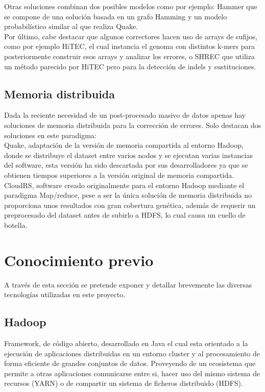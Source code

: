 \documentclass[conference]{IEEEtran}
\begin{document}
Otras soluciones combinan dos posibles modelos como por ejemplo: Hammer que se compone de una solución basada en un grafo Hamming y un modelo probabilístico similar al que realiza Quake.\\

Por último, cabe destacar que algunos correctores hacen uso de arrays de sufijos, como por ejemplo HiTEC, el cual instancia el genoma con distintos k-mers para posteriormente construir esos arrays y analizar los errores, o SHREC que utiliza un método parecido por HiTEC pero para la detección de indels y sustituciones.\\

\subsection{Memoria distribuida}
Dada la reciente necesidad de un post-procesado masivo de datos apenas hay soluciones de memoria distribuida para la corrección de errores. Solo destacan dos soluciones en este paradigma:\\

Quake, adaptación de la versión de memoria compartida al entorno Hadoop, donde se distribuye el dataset entre varios nodos y se ejecutan varias instancias del software, esta versión ha sido descartada por sus desarrolladores ya que se obtienen tiempos superiores a la versión original de memoria compartida.\\

CloudRS, software creado originalmente para el entorno Hadoop mediante el paradigma Map/reduce, pese a ser la única solución de memoria distribuida no proporciona unos resultados con gran cobertura genética, además de requerir un preprocesado del dataset antes de subirlo a HDFS, lo cual causa un cuello de botella.\\

\section{Conocimiento previo}

A través de esta sección se pretende exponer y detallar brevemente las diversas tecnologías utilizadas en este proyecto.

\subsection{Hadoop}
Framework, de código abierto, desarrollado en Java el cual esta orientado a la ejecución de aplicaciones distribuidas en un entorno cluster y al procesamiento de forma eficiente de grandes conjuntos de datos. Proveyendo de un ecosistema que permite a otras aplicaciones comunicarse entre si, hacer uso del mismo sistema de recursos (YARN) o de compartir un sistema de ficheros distribuido (HDFS).
\end{document}
